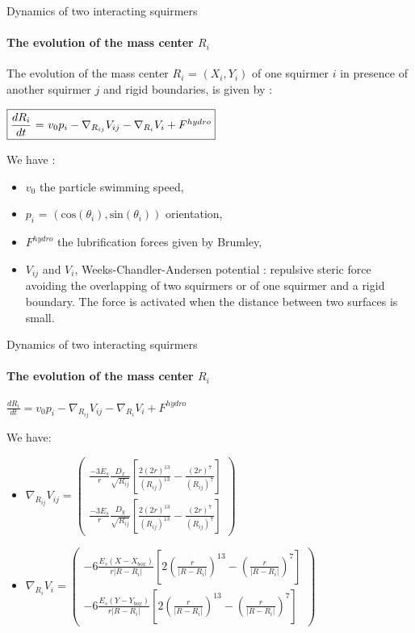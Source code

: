 \documentclass{beamer}
\begin{document}
\begin{frame}{Dynamics of two interacting squirmers}
        \framesubtitle{The evolution of the mass center $R_i$}
        The evolution of the mass center $R_i$ = $(X_i, Y_i)$ of one squirmer $i$ in presence of 
    another squirmer $j$ and rigid boundaries, is given by :
    \begin{center}
    $\boxed{\frac{dR_i}{dt}$ = $v_0 p_i -  \nabla_{R_{ij}} V_{ij} - \nabla_{R_i} V_i + F^{hydro}}$
    \end{center}
    We have : \begin{itemize}
        \item $v_0$ the particle swimming speed,
        \item $p_i$ = $(\mathrm{cos}(\theta_i),\mathrm{sin}(\theta_i))$ orientation,
        \item $F^{hydro}$ the lubrification forces given by Brumley\cite{Brumley},
        \item $V_{ij}$ and $V_i$, Weeks-Chandler-Andersen potential : repulsive steric force avoiding the overlapping of two squirmers or of one squirmer and a rigid boundary. The force is activated when the distance between two surfaces is small.
    \end{itemize}
\end{frame}
    
\begin{frame}{Dynamics of two interacting squirmers}
    \framesubtitle{The evolution of the mass center $R_i$}
    \begin{center}
        \(\boxed{\frac{dR_i}{dt} = v_0 p_i -  \nabla_{R_{ij}} V_{ij} - \nabla_{R_i} V_i + F^{hydro}}\)
    \end{center}
    We have: 
    \begin{itemize}
        \item \(\nabla_{R_{ij}} V_{ij} = 
        \begin{pmatrix}
            \frac{-3 E_s}{r} \frac{D_x}{\sqrt{R_{ij}}}\left[ \frac{2(2r)^{13}}{(R_{ij})^{13}} - \frac{(2r)^7}{(R_{ij})^7} \right] \\
            \frac{-3 E_s}{r} \frac{D_y}{\sqrt{R_{ij}}}\left[ \frac{2(2r)^{13}}{(R_{ij})^{13}} - \frac{(2r)^7}{(R_{ij})^7} \right]
        \end{pmatrix}\)
        \item \(\nabla_{R_i} V_i = 
        \begin{pmatrix}
            -6 \frac{E_s (X-X_{box})}{r \lvert R - R_i \rvert } \left[ 2 \left( \frac{r}{\lvert R-R_i\rvert} \right)^{13} - \left( \frac{r}{\lvert R-R_i\rvert}\right)^7 \right] \\
            -6 \frac{E_s (Y-Y_{box})}{r \lvert R - R_i \rvert } \left[ 2 \left( \frac{r}{\lvert R-R_i\rvert} \right)^{13} - \left( \frac{r}{\lvert R-R_i\rvert}\right)^7 \right]
        \end{pmatrix}\)
    \end{itemize}
\end{frame}
\end{document}
